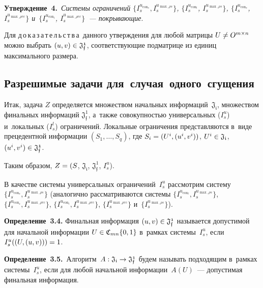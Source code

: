 \begin{multicols}{2}
\smallskip

\noindent
\textbf{Утверждение~4.}\ \textit{Системы ограничений $\{I_s^{u_{\mathrm{con}_s}}, 
I_s^{u_{\max\_\rho s}}\}$, $\{I_s^{u_{\mathrm{con}_l}}$, $I_s^{u_{\max\_\rho s}}\}$,
$\{I_s^{u_{\mathrm{con}_s}}$, $I_s^{u_{\max\_\rho rc}}\}$ 
и~$\{I_s^{u_{\mathrm{con}_l}}$, $I_s^{u_{\max\_\rho rc}}\}$~--- покрывающие}.

\smallskip

\noindent
Для д\,о\,к\,а\,з\,а\,т\,е\,л\,ь\,с\,т\,в\,а\ данного утверждения для любой 
матрицы $U\hm\ne O^{m\times n}$ 
можно выбрать $(u,v) \hm\in \mathfrak{J_{f}^1}$, соответствующие подматрице из 
единиц максимального размера.


\subsection{Разрешимые  задачи для~случая~одного~сгущения}

Итак, задача $Z$ определяется множеством начальных информаций~$\mathfrak{J_i}$, 
множеством финальных информаций $\mathfrak{J_{f}^1}$, а~также совокупностью 
универсальных ($I_s^u$) и~локальных ($I_s^l$) ограничений.
Локальные ограничения представляются в~виде прецедентной информации  
$(S_1,\ldots,S_q)$, где $S_i \hm= (U^i , (u^i, v^i))$, $U^i \hm\in \mathfrak{J_i}$, 
$(u^i, v^i) \hm\in \mathfrak{J_{f}^1}$.

Таким образом, $Z \hm= (S$, $\mathfrak{J_i}$, $\mathfrak{J_f^1}$, $I_s^u$).

В качестве системы универсальных ограничений~$I_s^u$ рассмотрим систему 
$\{I_s^{u_{\mathrm{con}_s}}, I_s^{u_{\max\_\rho s}}\}$ (аналогично рассматриваются системы 
$\{I_s^{u_{\mathrm{con}_l}}, I_s^{u_{\max\_\rho s}}\}$, $\{I_s^{u_{\mathrm{con}_s}}, 
I_s^{u_{\max\_\rho rc}}\}$, 
$\{I_s^{u_{\mathrm{con}_l}}, I_s^{u_{\max\_\rho rc}}\}$,
$\{I_s^{u_{\max\_\rho rc}}\}$ и~$\{I_s^{u_{\max\_\rho s}}\}$).

\smallskip

\noindent
\textbf{Определение~3.4.}  Финальная 
информация $(u,v) \hm\in \mathfrak{J_{f}^1}$ называется допустимой для начальной 
информации $U \hm\in \mathfrak{C}_{mn}\{0,1\}$ в~рамках системы~$I_s^u$, если 
$I_s^u((U, (u,v)))\hm=1$.

\smallskip

\noindent
\textbf{Определение~3.5.}\ Алгоритм~$A: 
\mathfrak{J_i} \hm\rightarrow \mathfrak{J_f^1}$ будем называть подходящим в~рамках 
системы~$I_s^u$, если для любой начальной информации~$A(U)$~--- допустимая 
финальная информация.


\end{multicols}
